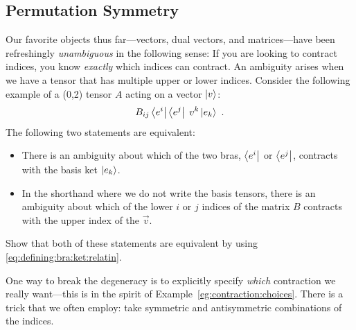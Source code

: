 \begin{subappendices}


\section{Permutation Symmetry}\label{sec:permutation:symmerty}

Our favorite objects thus far---vectors, dual vectors, and matrices---have been refreshingly \emph{unambiguous} in the following sense: If you are looking to contract indices, you know \emph{exactly} which indices can contract. An ambiguity arises when we have a tensor that has multiple upper or lower indices. Consider the following example of a (0,2) tensor $A$ acting on a vector $\left|v\right\rangle$:
\begin{align}
    B_{ij}\left\langle e^i\right|\left\langle e^j\right| \; v^k \left|e_k\right\rangle \ .
\end{align}
The following two statements are equivalent:
\begin{itemize}
    \item There is an ambiguity about which of the two bras, $\left\langle e^i\right|$ or $\left\langle e^j\right|$, contracts with the basis ket $\left|e_k\right\rangle$. 
    \item In the shorthand where we do not write the basis tensors, there is an ambiguity about which of the lower $i$ or $j$ indices of the matrix $B$ contracts with the upper index of the $\vec{v}$.
\end{itemize}
\begin{exercise}
Show that both of these statements are equivalent by using \eqref{eq:defining:bra:ket:relatin}. 
\end{exercise}
One way to break the degeneracy is to explicitly specify \emph{which} contraction we really want---this is in the spirit of Example~\ref{eg:contraction:choices}. There is a trick that we often employ: take symmetric and antisymmetric combinations of the indices.


\end{subappendices}
